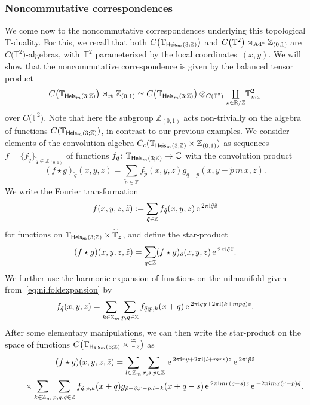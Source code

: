 \documentclass[pdftex]{sigma}
\numberwithin{equation}{section}
\def\nn{\nonumber}
\newcommand{\Z}{\zed}
\def\ii{{{\rm i}}}
\newcommand{\Heis}{{\sf Heis}}
\newcommand{\rt}{{\rm rt}}
\newcommand{\mcoprod}{\mbox{$\coprod\limits_{x\in\R/\Z}$}}
\newcommand{\R}{\real}
\newcommand{\complex}{{\mathbb C}} %
\newcommand{\zed}{{\mathbb Z}} %
\newcommand{\real}{{\mathbb R}} %
\newcommand{\torus}{{\mathbb T}} %
\def\nn{\nonumber}
\def\e{{\,\rm e}\,}
\begin{document}
\subsubsection*{Noncommutative correspondences}

We come now to the noncommutative correspondences underlying this
topological T-duality. For this, we recall that both
$C\big(\torus_{\Heis_m(3;\Z)}\big)$ and $C\big(\torus^2\big)\rtimes_{{\rm Ad}^*}\Z_{(0,1)}$
are $C\big(\torus^2\big)$-algebras, with~$\torus^2$
parameterized by the local coordinates~$(x,y)$. We will show that the
noncommutative correspondence is given by the balanced tensor product
\[
C\big(\torus_{\Heis_m(3;\Z)}\big)\rtimes_\rt\Z_{(0,1)} \simeq
C\big(\torus_{\Heis_m(3;\Z)}\big)\otimes_{C(\torus^2)} \mcoprod \torus_{m x}^2
\]
over $C\big(\torus^2\big)$.
Note that here the subgroup $\Z_{(0,1)}$ acts non-trivially on the algebra
of functions $C(\torus_{\Heis_m(3;\Z)})$, in contrast to our previous examples. We consider elements of the convolution
algebra $
C_{\rm c}(\torus_{\Heis_m(3;\Z)}\times\Z_{(0,1)})$ as sequences $f=\{f_{\tilde q}\}_{\tilde q\in\Z_{(0,1)}}$ of functions
$f_{\tilde q}\colon \torus_{\Heis_m(3;\Z)}\to\complex$ with the convolution product
\[
(f\star g)_{\tilde q}(x,y,z) = \sum_{\tilde p\in\Z} f_{\tilde p}(x,y,z)
g_{\tilde q-\tilde p}(x,y-\tilde p\,m\,x,z) .
\]
We write the Fourier transformation
\[
f(x,y,z,\tilde z) := \sum_{\tilde q\in\Z} f_{\tilde q}(x,y,z)
\e^{2\pi\ii \tilde q \tilde z}
\]
for functions on $\torus_{\Heis_m(3;\Z)}\times\widetilde\torus_z$, and define the star-product
\[
(f\star g)(x,y,z,\tilde z) = \sum_{\tilde q\in\Z} (f\star
g)_{\tilde q}(x,y,z) \e^{2\pi\ii \tilde q \tilde z} .
\]
We further use the harmonic expansion of functions on the nilmanifold
given from~\eqref{eq:nilfoldexpansion} by
\[
f_{\tilde q}(x,y,z) = \sum_{k\in\Z_m} \sum_{p,q\in\Z} f_{\tilde
 q;p,k}(x+q) \e^{2\pi\ii q y+2\pi\ii (k+m p q) z} .
\]
After some elementary manipulations, we can then write the star-product on
the space of functions $C\big(\torus_{\Heis_m(3;\Z)}\times\widetilde\torus_z\big)$ as
\begin{gather}
(f\star g)(x,y,z,\tilde z) = \sum_{l\in\Z_m} \sum_{r,s,\tilde
 p\in\Z} \e^{2\pi\ii r y+2\pi\ii(l+m r s)z}
 \e^{2\pi\ii\tilde p \tilde z} \nn \\
 \qquad{} \times \sum_{k\in\Z_m}
 \sum_{p,q,\tilde q\in\Z}
 f_{\tilde q;p,k}(x+q)
 g_{\tilde p-\tilde
 q;r-p,l-k}(x+q-s) \e^{2\pi\ii
 mr(q-s)z}
 \e^{-2\pi\ii
 mx(r-p)\tilde q}.\label{eq:starprodNCcorr}
\end{gather}
\end{document}
